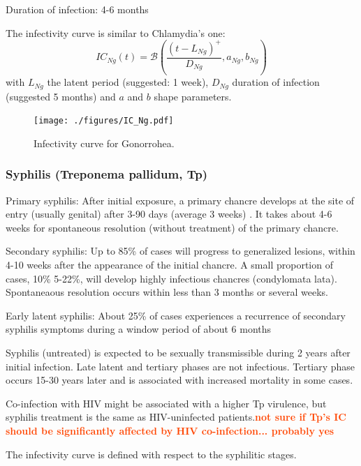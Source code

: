 \documentclass[11pt, onecolumn]{article}
\newcommand{\warning}[1]{\textbf{\textcolor{OrangeRed}{#1}}}
\begin{document}
 Duration of infection: 4-6 months \cite{Chen:2010hx,Korenromp:2002gt}
 
 The infectivity curve is similar to Chlamydia's one:
$$IC_{Ng}(t) = \mathcal{B}\left(\frac{(t-L_{Ng})^+}{D_{Ng}},a_{Ng},b_{Ng}\right)$$
with $L_{Ng}$ the latent period (suggested: 1 week), $D_{Ng}$ duration of infection (suggested 5 months) and $a$ and $b$ shape parameters.
\begin{figure}[!ht]
\centering
    \texttt{[image: ./figures/IC\_Ng.pdf]}
\caption{Infectivity curve for Gonorrohea.}
\label{fig:ICNg}
\end{figure} 
 
 
 \subsubsection{Syphilis (Treponema pallidum, Tp)}

Primary syphilis: After initial exposure, a primary chancre develops at the site of entry (usually genital) after 3-90 days (average 3 weeks) \cite{Kent:2008ch,Horvath:2011fw}. It takes about 4-6 weeks for spontaneous resolution (without treatment) of the primary chancre.

Secondary syphilis: Up to 85\% of cases will progress to generalized lesions\cite{Horvath:2011fw}, within 4-10 weeks after the appearance of the initial chancre\cite{Kent:2008ch,Horvath:2011fw}. A small proportion of cases, 10\%\cite{Horvath:2011fw} 5-22\%\cite{Kent:2008ch}, will develop highly infectious chancres (condylomata lata). Spontaneaous resolution occurs within less than 3 months\cite{Horvath:2011fw} or several weeks\cite{Kent:2008ch}.

Early latent syphilis: About 25\% of cases experiences a recurrence of secondary syphilis symptoms during a window period of about 6 months

Syphilis (untreated) is expected to be sexually transmissible during 2 years after initial infection\cite{Horvath:2011fw}. Late latent and tertiary phases are not infectious. Tertiary phase occurs 15-30 years later and is associated with increased mortality in some cases. 

Co-infection with HIV might be associated with a higher Tp virulence, but syphilis treatment is the same as HIV-uninfected patients\cite{Kent:2008ch}.\warning{not sure if Tp's IC should be significantly affected by HIV co-infection... probably yes}

The infectivity curve is defined with respect to the syphilitic stages.
\end{document}
